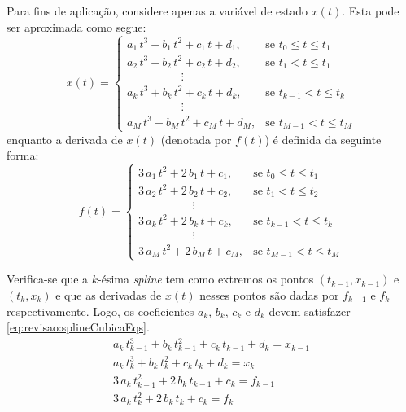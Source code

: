 Para fins de aplicação, considere apenas a variável de estado $ x(t) $. Esta pode ser aproximada como segue:
%
\begin{equation}
	\label{eq:revisao:xTrapInterp}
	x(t) = 
	\begin{cases} 
		a_1 \, t^3 + b_1 \, t^2 + c_1 \, t + d_1, & \mbox{se } t_0 \leq t \leq t_1 \\ 
		a_2 \, t^3 + b_2 \, t^2 + c_2 \, t + d_2, & \mbox{se } t_1 < t \leq t_1 \\ 
		\hspace{2cm} \vdots \\
		a_k \, t^3 + b_k \, t^2 + c_k \, t + d_k, & \mbox{se } t_{k-1} < t \leq t_{k} \\ 
		\hspace{2cm} \vdots \\
		a_M \, t^3 + b_M \, t^2 + c_M \, t + d_M, & \mbox{se } t_{M-1} < t \leq t_M
	\end{cases}
\end{equation} 
%
enquanto a derivada de $ x(t) $ (denotada por $ f(t) $) é definida da seguinte forma:
%
\begin{equation}
	\label{eq:revisao:fTrapInterp}
	f(t) = 
	\begin{cases} 
		3 \, a_1 \, t^2 + 2 \, b_1 \, t + c_1, & \mbox{se } t_0 \leq t \leq t_1 \\ 
		3 \, a_2 \, t^2 + 2 \, b_2 \, t + c_2, & \mbox{se } t_1 < t \leq t_2 \\ 
		\hspace{2cm} \vdots \\
		3 \, a_k \, t^2 + 2 \, b_k \, t + c_k, & \mbox{se } t_{k-1} < t \leq t_{k} \\ 
		\hspace{2cm} \vdots \\
		3 \, a_M \, t^2 + 2 \, b_M \, t + c_M, & \mbox{se } t_{M-1} < t \leq t_M
	\end{cases}
\end{equation} 

Verifica-se que a $ k $-ésima \textit{spline} tem como extremos os pontos $ (t_{k-1}, x_{k-1}) $ e $ (t_k, x_k) $ e que as derivadas de $ x(t) $ nesses pontos são dadas por $ f_{k-1} $ e $ f_k $ respectivamente. Logo, os coeficientes $ a_k $, $ b_k $, $ c_k $ e $ d_k $ devem satisfazer \eqref{eq:revisao:splineCubicaEqs}.
%
\begin{equation}
	\label{eq:revisao:splineCubicaEqs}
	\begin{gathered}
		a_k \, t_{k-1}^3 + b_k \, t_{k-1}^2 + c_k \, t_{k-1} + d_k = x_{k-1} \\
		a_k \, t_{k}^3 + b_k \, t_{k}^2 + c_k \, t_{k} + d_k = x_{k} \\
		3 \, a_k \, t_{k-1}^2 + 2 \, b_k \, t_{k-1} + c_k = f_{k-1} \\
		3 \, a_k \, t_{k}^2 + 2 \, b_k \, t_{k} + c_k = f_{k}
	\end{gathered}
\end{equation}

